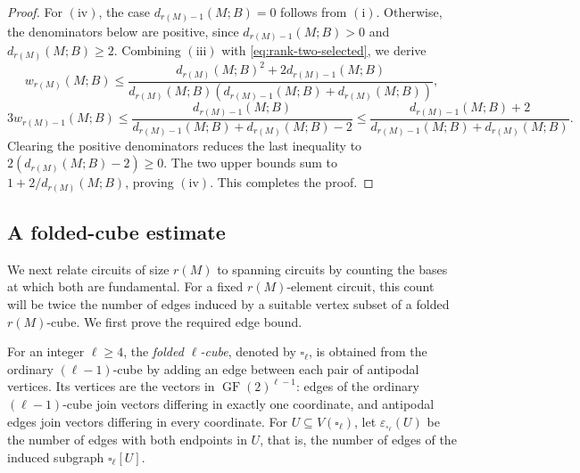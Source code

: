 \documentclass[11pt]{article}
\numberwithin{equation}{section}
\DeclareMathOperator{\GF}{GF}
\newcommand{\FF}{\GF(2)}
\newcommand{\wloc}[1]{w_{#1}(M;B)}
\newcommand{\dloc}[1]{d_{#1}(M;B)}
\begin{document}
\begin{proof}
For \(\mathrm{(iv)}\), the case \(\dloc{r(M)-1}=0\)
follows from \(\mathrm{(i)}\). Otherwise, the denominators below
are positive, since \(\dloc{r(M)-1}>0\) and \(\dloc{r(M)}\ge2\).
Combining \(\mathrm{(iii)}\) with \eqref{eq:rank-two-selected}, we derive
\[
 \wloc{r(M)}\le\frac{\dloc{r(M)}^2+2\dloc{r(M)-1}}
 {\dloc{r(M)}(\dloc{r(M)-1}+\dloc{r(M)})},
\]
\[
 3\wloc{r(M)-1}\le\frac{\dloc{r(M)-1}}{\dloc{r(M)-1}+\dloc{r(M)}-2}\le\frac{\dloc{r(M)-1}+2}{\dloc{r(M)-1}+\dloc{r(M)}}.
\]
Clearing the positive denominators reduces the last inequality to
\(2(\dloc{r(M)}-2)\ge0\).
The two upper bounds sum to \(1+2/\dloc{r(M)}\), proving \(\mathrm{(iv)}\). This completes the proof.
\end{proof}

\subsection{A folded-cube estimate}

We next relate circuits of size \(r(M)\) to spanning circuits
by counting the bases at which both are fundamental.
For a fixed \(r(M)\)-element circuit, this count will be twice
the number of edges induced by a suitable vertex subset of a
folded \(r(M)\)-cube. We first prove the required edge bound.

For an integer \(\ell\ge4\), the \emph{folded \(\ell\)-cube}, denoted by \(\square_\ell\), is
obtained from the ordinary \((\ell-1)\)-cube by adding an edge
between each pair of antipodal vertices. Its vertices are the
vectors in \(\FF^{\ell-1}\): edges of the ordinary \((\ell-1)\)-cube join
vectors differing in exactly one coordinate, and antipodal edges join
vectors differing in every coordinate.
For \(U\subseteq V(\square_\ell)\), let
\(\varepsilon_{\square_\ell}(U)\) be the number of edges with
both endpoints in \(U\), that is, the number of edges of
the induced subgraph \(\square_\ell[U]\).
\end{document}
